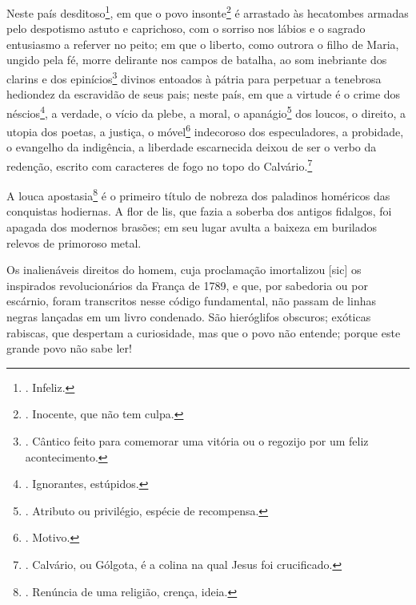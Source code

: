Neste país desditoso\footnote{. Infeliz.}, em que o povo
insonte\footnote{. Inocente, que não tem culpa.} é arrastado às
hecatombes armadas pelo despotismo astuto e caprichoso, com o sorriso
nos lábios e o sagrado entusiasmo a referver no peito; em que o liberto,
como outrora o filho de Maria, ungido pela fé, morre delirante nos
campos de batalha, ao som inebriante dos clarins e dos
epinícios\footnote{. Cântico feito para comemorar uma vitória ou o
  regozijo por um feliz acontecimento.} divinos entoados à pátria para
perpetuar a tenebrosa hediondez da escravidão de seus pais; neste país,
em que a virtude é o crime dos néscios\footnote{. Ignorantes, estúpidos.},
a verdade, o vício da plebe, a moral, o apanágio\footnote{. Atributo ou
  privilégio, espécie de recompensa.} dos loucos, o direito, a utopia
dos poetas, a justiça, o móvel\footnote{. Motivo.} indecoroso dos
especuladores, a probidade, o evangelho da indigência, a liberdade
escarnecida deixou de ser o verbo da redenção, escrito com caracteres de
fogo no topo do Calvário.\footnote{. Calvário, ou Gólgota, é a colina na
  qual Jesus foi crucificado.}

A louca apostasia\footnote{. Renúncia de uma religião, crença, ideia.} é
o primeiro título de nobreza dos paladinos homéricos das conquistas
hodiernas. A flor de lis, que fazia a soberba dos antigos fidalgos, foi
apagada dos modernos brasões; em seu lugar avulta a baixeza em burilados
relevos de primoroso metal.

Os inalienáveis direitos do homem, cuja proclamação imortalizou
{[}sic{]} os inspirados revolucionários da França de 1789, e que, por
sabedoria ou por escárnio, foram transcritos nesse código fundamental,
não passam de linhas negras lançadas em um livro condenado. São
hieróglifos obscuros; exóticas rabiscas, que despertam a curiosidade,
mas que o povo não entende; porque este grande povo não sabe ler!

